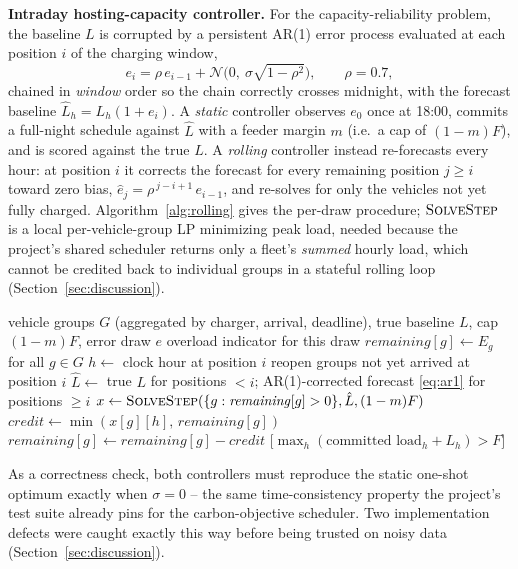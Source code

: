 \documentclass[journal]{IEEEtran}
\begin{document}
\textbf{Intraday hosting-capacity controller.} For the capacity-reliability problem, the baseline $L$ is corrupted by a persistent AR(1) error process evaluated at each position $i$ of the charging window,
\begin{equation}
e_i = \rho\, e_{i-1} + \mathcal{N}\!\big(0,\ \sigma\sqrt{1-\rho^2}\big), \qquad \rho = 0.7,
\label{eq:ar1}
\end{equation}
chained in \emph{window} order so the chain correctly crosses midnight, with the forecast baseline $\hat L_h = L_h(1+e_i)$. A \emph{static} controller observes $e_0$ once at 18:00, commits a full-night schedule against $\hat L$ with a feeder margin $m$ (i.e.\ a cap of $(1-m)F$), and is scored against the true $L$. A \emph{rolling} controller instead re-forecasts every hour: at position $i$ it corrects the forecast for every remaining position $j \ge i$ toward zero bias, $\widehat{e}_j = \rho^{\,j-i+1}\, e_{i-1}$, and re-solves for only the vehicles not yet fully charged. Algorithm~\ref{alg:rolling} gives the per-draw procedure; $\textsc{SolveStep}$ is a local per-vehicle-group LP minimizing peak load, needed because the project's shared scheduler returns only a fleet's \emph{summed} hourly load, which cannot be credited back to individual groups in a stateful rolling loop (Section~\ref{sec:discussion}).
\begin{algorithm}[t]
\caption{Rolling intraday hosting-capacity controller (one draw)}
\label{alg:rolling}
\begin{algorithmic}[1]
\Require vehicle groups $G$ (aggregated by charger, arrival, deadline), true baseline $L$, cap $(1-m)F$, error draw $e$
\Ensure overload indicator for this draw
\State $\mathit{remaining}[g] \gets E_g$ for all $g \in G$
 
  \State $h \gets$ clock hour at position $i$
  \State reopen groups not yet arrived at position $i$
  \State $\hat L \gets$ true $L$ for positions $< i$; AR(1)-corrected forecast \eqref{eq:ar1} for positions $\ge i$
  \State $x \gets \textsc{SolveStep}(\{g : \mathit{remaining}[g]>0\}, \hat L, (1-m)F)$
    \State $\mathit{credit} \gets \min(x[g][h],\, \mathit{remaining}[g])$
    \State $\mathit{remaining}[g] \gets \mathit{remaining}[g] - \mathit{credit}$
  \EndFor
\EndFor
\State \Return $\big[\max_h (\text{committed load}_h + L_h) > F\big]$
\end{algorithmic}
\end{algorithm}
As a correctness check, both controllers must reproduce the static one-shot optimum exactly when $\sigma=0$ -- the same time-consistency property the project's test suite already pins for the carbon-objective scheduler. Two implementation defects were caught exactly this way before being trusted on noisy data (Section~\ref{sec:discussion}).
\end{document}
